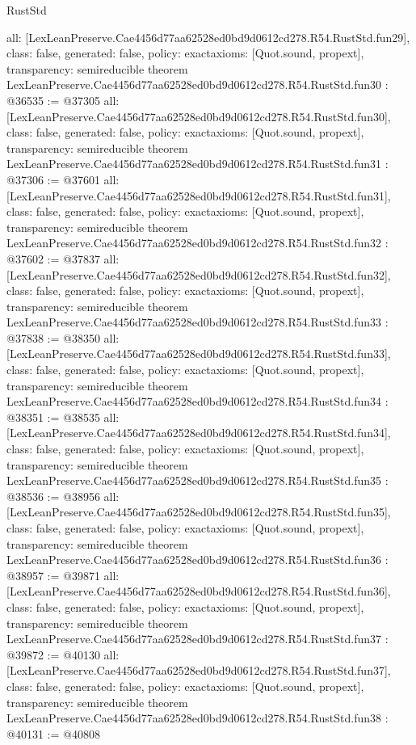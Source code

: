 \begin{lexlean}{RustStd}
\begin{coremodule}
{  all: [LexLeanPreserve.Cae4456d77aa62528ed0bd9d0612cd278.R54.RustStd.fun29],
  class: false,
  generated: false,
  policy: exact{axioms: [Quot.sound, propext]},
  transparency: semireducible
}
theorem LexLeanPreserve.Cae4456d77aa62528ed0bd9d0612cd278.R54.RustStd.fun30 : @36535 := @37305 {
  all: [LexLeanPreserve.Cae4456d77aa62528ed0bd9d0612cd278.R54.RustStd.fun30],
  class: false,
  generated: false,
  policy: exact{axioms: [Quot.sound, propext]},
  transparency: semireducible
}
theorem LexLeanPreserve.Cae4456d77aa62528ed0bd9d0612cd278.R54.RustStd.fun31 : @37306 := @37601 {
  all: [LexLeanPreserve.Cae4456d77aa62528ed0bd9d0612cd278.R54.RustStd.fun31],
  class: false,
  generated: false,
  policy: exact{axioms: [Quot.sound, propext]},
  transparency: semireducible
}
theorem LexLeanPreserve.Cae4456d77aa62528ed0bd9d0612cd278.R54.RustStd.fun32 : @37602 := @37837 {
  all: [LexLeanPreserve.Cae4456d77aa62528ed0bd9d0612cd278.R54.RustStd.fun32],
  class: false,
  generated: false,
  policy: exact{axioms: [Quot.sound, propext]},
  transparency: semireducible
}
theorem LexLeanPreserve.Cae4456d77aa62528ed0bd9d0612cd278.R54.RustStd.fun33 : @37838 := @38350 {
  all: [LexLeanPreserve.Cae4456d77aa62528ed0bd9d0612cd278.R54.RustStd.fun33],
  class: false,
  generated: false,
  policy: exact{axioms: [Quot.sound, propext]},
  transparency: semireducible
}
theorem LexLeanPreserve.Cae4456d77aa62528ed0bd9d0612cd278.R54.RustStd.fun34 : @38351 := @38535 {
  all: [LexLeanPreserve.Cae4456d77aa62528ed0bd9d0612cd278.R54.RustStd.fun34],
  class: false,
  generated: false,
  policy: exact{axioms: [Quot.sound, propext]},
  transparency: semireducible
}
theorem LexLeanPreserve.Cae4456d77aa62528ed0bd9d0612cd278.R54.RustStd.fun35 : @38536 := @38956 {
  all: [LexLeanPreserve.Cae4456d77aa62528ed0bd9d0612cd278.R54.RustStd.fun35],
  class: false,
  generated: false,
  policy: exact{axioms: [Quot.sound, propext]},
  transparency: semireducible
}
theorem LexLeanPreserve.Cae4456d77aa62528ed0bd9d0612cd278.R54.RustStd.fun36 : @38957 := @39871 {
  all: [LexLeanPreserve.Cae4456d77aa62528ed0bd9d0612cd278.R54.RustStd.fun36],
  class: false,
  generated: false,
  policy: exact{axioms: [Quot.sound, propext]},
  transparency: semireducible
}
theorem LexLeanPreserve.Cae4456d77aa62528ed0bd9d0612cd278.R54.RustStd.fun37 : @39872 := @40130 {
  all: [LexLeanPreserve.Cae4456d77aa62528ed0bd9d0612cd278.R54.RustStd.fun37],
  class: false,
  generated: false,
  policy: exact{axioms: [Quot.sound, propext]},
  transparency: semireducible
}
theorem LexLeanPreserve.Cae4456d77aa62528ed0bd9d0612cd278.R54.RustStd.fun38 : @40131 := @40808 {
}
\end{coremodule}
\end{lexlean}
